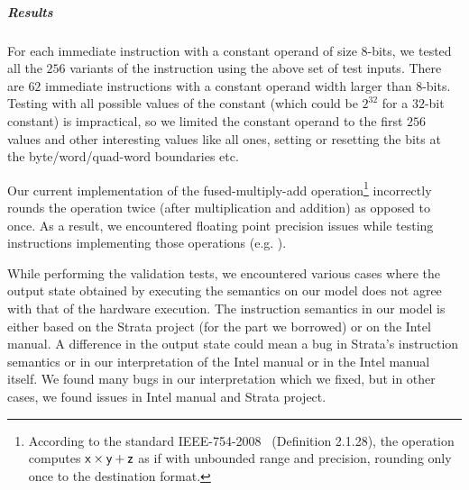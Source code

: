 
\subparagraph{Results}
For each immediate instruction with a constant operand of size $8$-bits, we tested all the $256$ variants of the instruction using the above set of test inputs. There are $62$ immediate instructions  with a constant operand width larger than $8$-bits.  Testing with all possible values of the constant (which could be $2^{32}$ for a $32$-bit constant) is impractical, so we limited the constant operand to the first $256$ values and other interesting values like  all ones, setting or resetting the bits at the byte/word/quad-word boundaries etc.  

Our current implementation of the fused-multiply-add operation\footnote{According to the standard IEEE-754-2008~\cite{FP} (Definition 2.1.28), the operation  computes $\textsf{x} \times \textsf{y} + \textsf{z}$ as if with unbounded range and precision, rounding only once to the destination format.} incorrectly rounds the operation twice (after multiplication and addition) as opposed to once. As a result, we encountered floating point precision issues while testing instructions implementing those operations (e.g. ).
 
 
While performing the validation tests, we encountered various cases where the output state obtained by executing the semantics on our model does not agree with that of the hardware execution. 
The instruction semantics in our model is either based on the Strata project (for the part we borrowed) or on the Intel manual. A difference in the output state could mean a bug in Strata's instruction semantics or in our interpretation of the Intel manual or in the Intel manual itself. We found many bugs in our interpretation which we fixed, but in other cases, we found issues  in Intel manual and Strata project.

